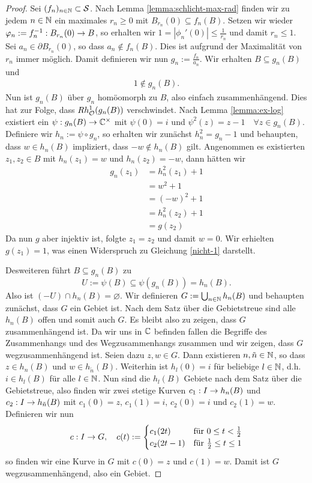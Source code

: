 \begin{proof}
  Sei $(f_n)_{n \in \mathbb{N}} \subset \mathcal{S}$.
  Nach Lemma \ref{lemma:schlicht-max-rad}  finden wir zu jedem $n \in \mathbb{N}$
  ein maximales $r_n \geq 0$ mit $B_{r_n}(0) \subseteq f_n(B)$. Setzen wir
  wieder $\varphi_n:=f_n^{-1} : B_{r_n}(0) \rightarrow B$, so erhalten wir $1 =
  |\phi_n'(0)| \leq \frac{1}{r_n}$ und damit $r_n \leq 1$. 
  Sei $a_n \in \partial B_{r_n}(0)$, so dass $a_n \notin f_n(B)$. Dies ist
  aufgrund der Maximalität von $r_n$ immer möglich. Damit definieren
  wir nun $g_n := \frac{f_n}{a_n}$. Wir erhalten $B \subseteq g_n(B)$
  und
  \begin{align}
  1 \notin g_n(B). \label{nicht-1}
  \end{align}
  Nun ist $g_n(B)$ über $g_n$ homöomorph zu $B$, also einfach
  zusammenhängend. Dies hat zur Folge, dass $Rh_{\mathcal{O}}^1(g_n(B))$
  verschwindet. 
  Nach Lemma \ref{lemma:ex-log} existiert ein $\psi: g_n(B) \rightarrow \mathbb{C}^\times$ mit
  $\psi(0) = i$ und $\psi^2(z) = z - 1 \quad \forall z \in g_n(B)$.
  Definiere wir $h_n := \psi \circ g_n$, so erhalten wir zunächst
  $h_n^2 = g_n - 1$ und behaupten, dass $w \in h_n(B)$ impliziert,
  dass $-w \notin h_n(B)$ gilt.
  Angenommen es existierten $z_1,z_2 \in B$ mit $h_n(z_1) = w$ und
  $h_n(z_2) = -w$, dann hätten wir
  \begin{align*}
    g_n(z_1) & = h_n^2(z_1) +1 \\
    & = w^2 +1 \\
    & = (-w)^2 +1 \\
    & = h_n^2(z_2) +1 \\
    & = g(z_2)
  \end{align*}
  Da nun $g$ aber injektiv ist, folgte $z_1 = z_2$ und damit $w =
  0$. Wir erhielten $g(z_1) = 1$, was einen Widerspruch zu Gleichung
  \eqref{nicht-1} darstellt. 

  Desweiteren führt $B \subseteq g_n(B)$ zu
  \[
  U:= \psi(B) \subseteq \psi(g_n(B)) = h_n(B).
  \]
  Also ist $(-U) \cap h_n(B) = \varnothing$.
  Wir definieren $G := \bigcup_{n \in \mathbb{N}} h_n(B)$ und behaupten
  zunächst, dass $G$ ein Gebiet ist.
  Nach dem Satz über die Gebietstreue sind alle $h_n(B)$ offen und
  somit auch $G$. Es bleibt also zu zeigen, dass $G$ zusammenhängend
  ist. Da wir uns in $\mathbb{C}$ befinden fallen die Begriffe des
  Zusammenhangs und des Wegzusammenhangs zusammen und wir zeigen, dass
  $G$ wegzusammenhängend ist.
  Seien dazu $z, w \in G$. Dann existieren $n, \tilde n \in \mathbb{N}$, so
  dass $z \in h_n(B)$ und $w \in h_{\tilde n} (B)$. Weiterhin ist
  $h_l(0) = i$ für beliebige $l \in \mathbb{N}$, d.h. $i \in h_l(B)$ für alle
  $l \in \mathbb{N}$. Nun sind die $h_l(B)$ Gebiete nach dem Satz über
  die Gebietstreue, also finden wir zwei stetige Kurven $c_1: I \rightarrow
  h_n(B)$ und $c_2: I \rightarrow h_{\tilde n}(B)$ mit $c_1(0) = z$, $c_1(1) =
  i$, $c_2(0) = i$ und $c_2(1) = w$. Definieren wir nun
  \[
  c: I \rightarrow G, \quad c(t) :=
  \begin{cases}
    c_1(2t) & \text{für } 0 \leq t < \frac12\\
    c_2(2t-1) & \text{für } \frac12 \leq t \leq 1
  \end{cases}
  \]
  so finden wir eine Kurve in $G$ mit $c(0) = z$ und $c(1) = w$. Damit
  ist $G$ wegzusammenhängend, also ein Gebiet.


\end{proof}
